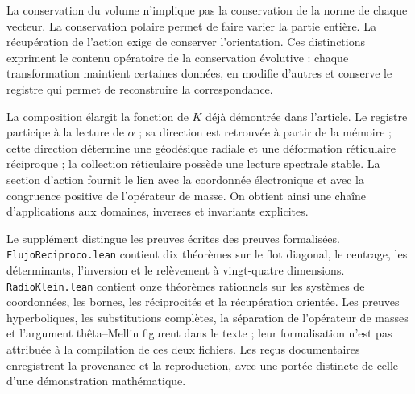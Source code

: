 La conservation du volume n'implique pas la conservation de la norme de chaque vecteur. La conservation polaire permet de faire varier la partie entière. La récupération de l'action exige de conserver l'orientation. Ces distinctions expriment le contenu opératoire de la conservation évolutive : chaque transformation maintient certaines données, en modifie d'autres et conserve le registre qui permet de reconstruire la correspondance.

La composition élargit la fonction de \(K\) déjà démontrée dans l’article. Le registre participe à la lecture de \(\alpha\) ; sa direction est retrouvée à partir de la mémoire ; cette direction détermine une géodésique radiale et une déformation réticulaire réciproque ; la collection réticulaire possède une lecture spectrale stable. La section d’action fournit le lien avec la coordonnée électronique et avec la congruence positive de l’opérateur de masse. On obtient ainsi une chaîne d’applications aux domaines, inverses et invariants explicites.

Le supplément distingue les preuves écrites des preuves formalisées. \texttt{FlujoReciproco.lean} contient dix théorèmes sur le flot diagonal, le centrage, les déterminants, l’inversion et le relèvement à vingt-quatre dimensions. \texttt{RadioKlein.lean} contient onze théorèmes rationnels sur les systèmes de coordonnées, les bornes, les réciprocités et la récupération orientée. Les preuves hyperboliques, les substitutions complètes, la séparation de l’opérateur de masses et l’argument thêta--Mellin figurent dans le texte ; leur formalisation n’est pas attribuée à la compilation de ces deux fichiers. Les reçus documentaires enregistrent la provenance et la reproduction, avec une portée distincte de celle d’une démonstration mathématique.
